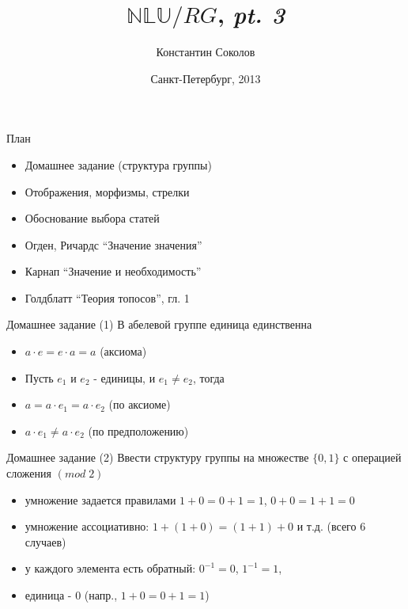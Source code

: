 \documentclass{beamer}
\begin{document}
\title{\huge{$\mathbb{NLU}/RG$, \textit{pt. 3}}}
\author{Константин Соколов}
\date{Санкт-Петербург, 2013} 
\begin{frame}
    \thispagestyle{empty}
    \titlepage
\end{frame}

\begin{frame}{План}
    \setcounter{framenumber}{1}
    \begin{itemize}
        \item Домашнее задание (структура группы)
        \item Отображения, морфизмы, стрелки
        \item Обоснование выбора статей
        \item Огден, Ричардс ``Значение значения''
        \item Карнап ``Значение и необходимость''
        \item Голдблатт ``Теория топосов'', гл. 1
    \end{itemize}
\end{frame}

\begin{frame}{Домашнее задание (1)}
В абелевой группе единица единственна\\
  \begin{itemize}
    \item $a \cdot e  = e \cdot a = a$ (аксиома)
    \item Пусть $e_1$ и $e_2$ - единицы, и $e_1 \neq e_2$, тогда 
    \item $a = a \cdot e_1 = a \cdot e_2$ (по аксиоме)
    \item $a \cdot e_1 \neq a \cdot e_2$ (по предположению)
  \end{itemize}  
\end{frame}

\begin{frame}{Домашнее задание (2)}
Ввести структуру группы на множестве $\{0, 1\}$ с операцией сложения $(mod \; 2)$\\
  \begin{itemize}
    \item умножение задается правилами $1 + 0 = 0 + 1 = 1$, $0 + 0 = 1 + 1 = 0$
    \item умножение ассоциативно: $1 + (1 + 0) = (1 + 1) + 0$ и т.д. (всего 6 случаев)
    \item у каждого элемента есть обратный: $0^{-1} = 0$, $1^{-1} = 1$, 
    \item единица - $0$ (напр., $1 + 0 = 0 + 1 = 1$) 
  \end{itemize}  
\end{frame}
\end{document}

